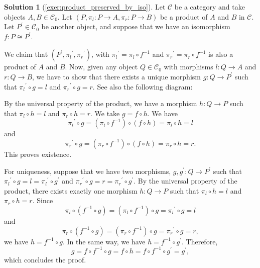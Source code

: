 \documentclass[a4paper,11pt, oneside,titlepage=false]{scrbook}
\theoremstyle{plain}
\theoremstyle{definition}
\newtheorem{solution}[thm]{Solution}
\newcommand{\Cat}[1]{\mathcal{#1}}
\newcommand{\CC}{\Cat{C}}
\newcommand{\Ob}[1]{{#1}_0}
\newcommand{\projl}{\ensuremath{\pi_l}}
\newcommand{\projr}{\ensuremath{\pi_r}}
\newcommand{\Inv}[1]{#1 ^{-1}}
\begin{document}
\begin{solution}[\cref{exer:product_preserved_by_iso}]\label{sol:product_preserved_by_iso}
	Let $ \CC $ be a category and take objects $ A, B \in \Ob\CC $. Let $ (P, \projl: P \to A, \projr: P \to B) $ be a product of $ A $ and $ B $ in $ \CC $. Let $ P^\prime \in \Ob\CC $ be another object, and suppose that we have an isomorphism $ f: P \cong P^\prime $.

	We claim that $ (P^\prime, \projl^\prime, \projr^\prime) $, with $ \projl^\prime = \projl \circ \Inv{f} $ and $ \projr^\prime = \projr \circ \Inv{f} $ is also a product of $ A $ and $ B $. Now, given any object $ Q \in \Ob\CC $ with morphisms $ l: Q \to A $ and $ r: Q \to B $, we have to show that there exists a unique morphism $ g: Q \to P^\prime $ such that $ \projl^\prime \circ g = l $ and $ \projr^\prime \circ g = r $. See also the following diagram:

	\begin{center}
	\end{center}

	By the universal property of the product, we have a morphism $ h: Q \to P $ such that $ \projl \circ h = l $ and $ \projr \circ h = r $. We take $ g = f \circ h $. We have
	\[ \projl^\prime \circ g = (\projl \circ \Inv{f}) \circ (f \circ h) = \projl \circ h = l  \]
	and
	\[ \projr^\prime \circ g = (\projr \circ \Inv{f}) \circ (f \circ h) = \projr \circ h = r.  \]
	This proves existence.

	For uniqueness, suppose that we have two morphisms, $ g, g^\prime: Q \to P^\prime $ such that $ \projl^\prime \circ g = l = \projl^\prime \circ g^\prime $ and $ \projr^\prime \circ g = r = \projr^\prime \circ g^\prime $. By the universal property of the product, there exists exactly one morphism $ h: Q \to P $ such that $ \projl \circ h = l $ and $ \projr \circ h = r $. Since
	\[ \projl \circ (\Inv{f} \circ g) = (\projl \circ \Inv{f}) \circ g = \projl^\prime \circ g = l \]
	and
	\[ \projr \circ (\Inv{f} \circ g) = (\projr \circ \Inv{f}) \circ g = \projr^\prime \circ g = r, \]
	we have $ h = \Inv{f} \circ g $. In the same way, we have $ h = \Inv f \circ g^\prime $. Therefore,
	\[ g = f \circ \Inv f \circ g = f \circ h = f \circ \Inv f \circ g^\prime = g^\prime, \]
	which concludes the proof.
\end{solution}
\end{document}
